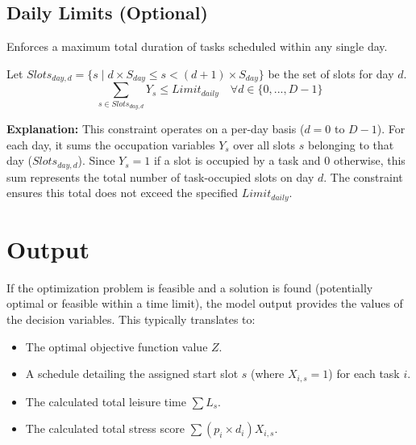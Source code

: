 \documentclass{article}
\begin{document}
\subsection{Daily Limits (Optional)}
Enforces a maximum total duration of tasks scheduled within any single day.

Let $Slots_{day, d} = \{s \mid d \times S_{day} \le s < (d+1) \times S_{day}\}$ be the set of slots for day $d$.
\[
\sum_{s \in Slots_{day, d}} Y_s \le Limit_{daily} \quad \forall d \in \{0, ..., D-1\}
\]

\textbf{Explanation:} This constraint operates on a per-day basis ($d=0$ to $D-1$). For each day, it sums the occupation variables $Y_s$ over all slots $s$ belonging to that day ($Slots_{day, d}$). Since $Y_s=1$ if a slot is occupied by a task and 0 otherwise, this sum represents the total number of task-occupied slots on day $d$. The constraint ensures this total does not exceed the specified $Limit_{daily}$.

\section{Output}

If the optimization problem is feasible and a solution is found (potentially optimal or feasible within a time limit), the model output provides the values of the decision variables. This typically translates to:
\begin{itemize}
    \item The optimal objective function value $Z$.
    \item A schedule detailing the assigned start slot $s$ (where $X_{i,s}=1$) for each task $i$.
    \item The calculated total leisure time $\sum L_s$.
    \item The calculated total stress score $\sum (p_i \times d_i) X_{i,s}$.
\end{itemize}
\end{document}
